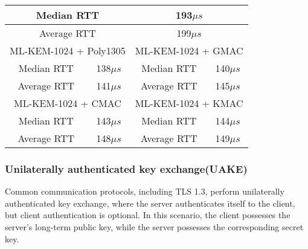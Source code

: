 \documentclass[floatrow,journal=tches,submission]{iacrtrans}
\newcommand{\us}{\mu s}
\begin{document}
\begin{table}[H]
\begin{tabular}{|c|c|c|c|}
        \hline
        \multicolumn{2}{|c|}{Median RTT}
        & \multicolumn{2}{|c|}{193$\us$} \\
        \hline
        \multicolumn{2}{|c|}{Average RTT}
        & \multicolumn{2}{|c|}{199$\us$} \\
        \hline\hline
        \multicolumn{2}{|c|}{ML-KEM-1024 + Poly1305}
        & \multicolumn{2}{|c|}{ML-KEM-1024 + GMAC} \\
        \hline
        Median RTT & 138$\us$ & Median RTT & 140$\us$ \\
        \hline
        Average RTT & 141$\us$ & Average RTT & 145$\us$ \\
        \hline\hline
        \multicolumn{2}{|c|}{ML-KEM-1024 + CMAC}
        & \multicolumn{2}{|c|}{ML-KEM-1024 + KMAC} \\
        \hline
        Median RTT & 143$\us$ & Median RTT & 144$\us$ \\
        \hline
        Average RTT & 148$\us$ & Average RTT & 149$\us$ \\
        \hline
    \end{tabular}
\end{table}

\subsubsection{Unilaterally authenticated key exchange(UAKE)}\label{sec:uakex}
Common communication protocols, including TLS 1.3, perform unilaterally authenticated key exchange, where the server authenticates itself to the client, but client authentication is optional. In this scenario, the client possesses the server's long-term public key, while the server possesses the corresponding secret key.
\end{document}
